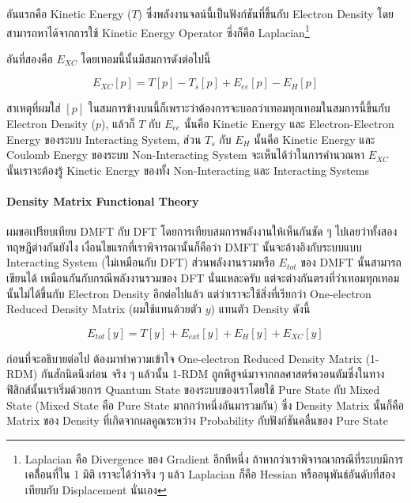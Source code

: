 อันแรกคือ Kinetic Energy ($T$) ซึ่งพลังงานจลน์นี้เป็นฟังก์ชันที่ขึ้นกับ Electron Density โดยสามารถหาได้จากการใช้ Kinetic Energy
Operator ซึ่งก็คือ Laplacian\footnote{Laplacian คือ Divergence ของ Gradient อีกทีหนึ่ง ถ้าหากว่าเราพิจารณากรณีที่ระบบมีการเคลื่้อนที่ใน
  1 มิติ เราจะได้ว่าจริง ๆ แล้ว Laplacian ก็คือ Hessian หรืออนุพันธ์อันดับที่สองเทียบกับ Displacement นั่นเอง}

อันที่สองคือ $E_{XC}$ โดยเทอมนี้นั้นมีสมการดังต่อไปนี้

\begin{equation}
  E_{XC}[p] = T[p]- T_{s}[p] + E_{ee}[p] - E_{H}[p]
\end{equation}

สาเหตุที่ผมใส่ $[p]$ ในสมการข้างบนนี้ก็เพราะว่าต้องการจะบอกว่าเทอมทุกเทอมในสมการนี้ขึ้นกับ Electron Density ($p$), แล้วก็ $T$ กับ
$E_{ee}$ นั้นคือ Kinetic Energy และ Electron-Electron Energy ของระบบ Interacting System, ส่วน $T_{s}$ กับ $E_{H}$
นั้นคือ Kinetic Energy และ Coulomb Energy ของระบบ Non-Interacting System จะเห็นได้ว่าในการคำนวณหา $E_{XC}$ นั้นเราจะต้องรู้
Kinetic Energy ของทั้ง Non-Interacting และ Interacting Systems

\paragraph{Density Matrix Functional Theory}

ผมขอเปรียบเทียบ DMFT กับ DFT โดยการเทียบสมการพลังงานให้เห็นกันชัด ๆ ไปเลยว่าทั้งสองทฤษฎีต่างกันยังไง เงื่อนไขแรกที่เราพิจารณานั้นก็คือว่า
DMFT นั้นจะอ้างอิงกับระบบแบบ Interacting System (ไม่เหมือนกับ DFT) ส่วนพลังงานรวมหรือ $E_{tot}$ ของ DMFT นั้นสามารถเขียนได้%
เหมือนกันกับกรณีพลังงานรวมของ DFT นั่นแหละครับ แต่จะต่างกันตรงที่ว่าเทอมทุกเทอมนั้นไม่ได้ขึ้นกับ Electron Density อีกต่อไปแล้ว
แต่ว่าเราจะใช้สิ่งที่เรียกว่า One-electron Reduced Density Matrix (ผมใช้แทนด้วยตัว $y$) แทนตัว Density ดังนี้

\begin{equation}
  E_{tot}[y] = T[y] + E_{ext}[y] + E_{H}[y] + E_{XC}[y]
\end{equation}

ก่อนที่จะอธิบายต่อไป ต้องมาทำความเข้าใจ One-electron Reduced Density Matrix (1-RDM) กันสักนิดนึงก่อน จริง ๆ แล้วนั้น 1-RDM
ถูกพิสูจน์มาจากกลศาสตร์ควอนตัมซึ่งในทางฟิสิกส์นั้นเราเริ่มด้วยการ Quantum State ของระบบของเราโดยใช้ Pure State กับ Mixed State
(Mixed State คือ Pure State มากกว่าหนึ่งอันมารวมกัน) ซึ่ง Density Matrix นั้นก็คือ Matrix ของ Density ที่เกิดจากผลคูณระหว่าง
Probability กับฟังก์ชันคลื่นของ Pure State

